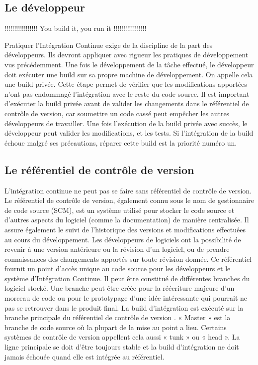 \documentclass{report}
\begin{document}
      \subsection{Le développeur}
      !!!!!!!!!!!!!!!!! You build it, you run it !!!!!!!!!!!!!!!!!

      Pratiquer l’Intégration Continue exige de la discipline de la part des développeurs. Ils devront appliquer avec rigueur les pratiques de développement vus précédemment. Une fois le développement de la tâche effectué, le développeur doit exécuter une build sur sa propre machine de développement. On appelle cela une build privée. Cette étape permet de vérifier que les modifications apportées n’ont pas endommagé l'intégration avec le reste du code source. Il est important d'exécuter la build privée avant de valider les changements dans le référentiel de contrôle de version, car soumettre un code cassé peut empêcher les autres développeurs de travailler. Une fois l’exécution de la build privée avec succès, le développeur peut valider les modifications, et les tests. Si l'intégration de la build échoue malgré ses précautions, réparer cette build est la priorité numéro un.

      \subsection{Le référentiel de contrôle de version}
      L'intégration continue ne peut pas se faire sans référentiel de contrôle de version. Le référentiel de contrôle de version, également connu sous le nom de gestionnaire de code source (SCM), est un système utilisé pour stocker le code source et d'autres aspects du logiciel (comme la documentation) de manière centralisée. Il assure également le suivi de l'historique des versions et modifications effectuées au cours du développement. Les développeurs de logiciels ont la possibilité de revenir à une version antérieure ou la révision d'un logiciel, ou de prendre connaissances des changements apportés sur toute révision donnée. Ce référentiel fournit un point d'accès unique au code source pour les développeurs et le système d’Intégration Continue. Il peut être constitué de différentes branches du logiciel stocké. Une branche peut être créée pour la réécriture majeure d’un morceau de code ou pour le prototypage d’une idée intéressante qui pourrait ne pas se retrouver dans le produit final. La build d’intégration est exécuté sur la branche principale du référentiel de contrôle de version \cite{Duv07}. « Master » est la branche de code source où la plupart de la mise au point a lieu. Certains systèmes de contrôle de version appellent cela aussi « tunk » ou « head ». La ligne principale se doit d’être toujours stable et la build d’intégration ne doit jamais échouée quand elle est intégrée au référentiel.
\end{document}
